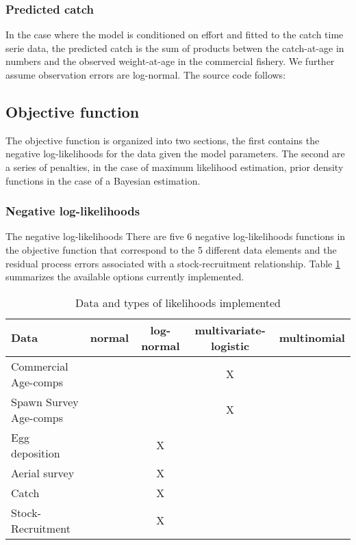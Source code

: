 \documentclass[12pt,letterpaper]{article}
\begin{document}
    \subsubsection{Predicted catch} %
    \label{ssub:predicted_catch}
    In the case where the model is conditioned on effort and fitted to the catch time serie data, the predicted catch is the sum of products betwen the catch-at-age in numbers and the observed weight-at-age in the commercial fishery.
    We further assume observation errors are log-normal. The source code follows:
    

  \subsection{Objective function} %
  \label{sub:objective_function}
  The objective function is organized into two sections, the first contains the negative log-likelihoods for the data given the model parameters.  The second are a series of penalties, in the case of maximum likelihood estimation, prior density functions in the case of a Bayesian estimation.
    \subsubsection{Negative log-likelihoods} %
    \label{ssub:negative_loglikelihoods}
    The negative log-likelihoods 
    There are five 6 negative log-likelihoods functions in the objective function that correspond to the 5 different data elements and the residual process errors associated with a stock-recruitment relationship. Table \ref{tab:likelihoodOptions} summarizes the available options currently implemented.

    \begin{table}[h]
      \caption{Data and types of likelihoods implemented}
      \label{tab:likelihoodOptions}
      \begin{tabular}{l|c|c|c|c}
        \hline
        Data & normal & log-normal & multivariate-logistic & multinomial\\
        \hline
        Commercial Age-comps & & & X\\
        Spawn Survey Age-comps & & & X\\
        Egg deposition & & X & \\
        Aerial survey & & X  & \\
        Catch  & & X & \\
        Stock-Recruitment & & X & \\
      \end{tabular}
    \end{table}
\end{document}

